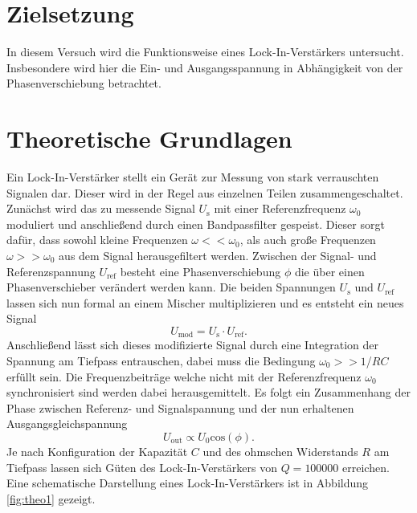 \section{Zielsetzung}

In diesem Versuch wird die Funktionsweise eines Lock-In-Verstärkers untersucht. Insbesondere wird hier die Ein- und Ausgangsspannung 
in Abhängigkeit von der Phasenverschiebung betrachtet.

\section{Theoretische Grundlagen}

Ein Lock-In-Verstärker stellt ein Gerät zur Messung von stark verrauschten Signalen dar. Dieser wird in der Regel aus einzelnen Teilen zusammengeschaltet. 
\\
Zunächst wird das zu messende Signal $U_\text{s}$ mit einer Referenzfrequenz $\omega_{0}$ moduliert und anschließend durch einen Bandpassfilter gespeist. Dieser sorgt dafür, dass sowohl kleine Frequenzen $\omega << \omega_{0}$, als auch große Frequenzen $\omega >> \omega_{0}$ aus dem Signal 
herausgefiltert werden. Zwischen der Signal- und Referenzspannung $U_\text{ref}$ besteht eine Phasenverschiebung $\phi$ die über einen Phasenverschieber verändert werden kann. Die beiden Spannungen $U_\text{s}$ und $U_\text{ref}$ lassen sich nun formal an einem Mischer multiplizieren und es entsteht ein
neues Signal 
\begin{equation*}
U_{\text{mod}} = U_\text{s} \cdot U_{\text{ref}}. 
\end{equation*}
Anschließend lässt sich dieses modifizierte Signal durch eine Integration der Spannung am Tiefpass entrauschen, dabei muss die Bedingung $\omega_0 >> 1$/$RC$ erfüllt sein. Die Frequenzbeiträge welche nicht mit der Referenzfrequenz $\omega_0$ synchronisiert sind werden dabei herausgemittelt.
Es folgt ein Zusammenhang der Phase zwischen Referenz- und Signalspannung und der
nun erhaltenen Ausgangsgleichspannung
\begin{equation}
    \label{eqn:yesss}
    U_{\text{out}} \propto U_{0} \text{cos}(\phi).
\end{equation}
Je nach Konfiguration der Kapazität $C$ und des ohmschen Widerstands $R$ am Tiefpass lassen sich Güten des Lock-In-Verstärkers von $Q = 100000$ erreichen.
\\
Eine schematische Darstellung eines Lock-In-Verstärkers ist in Abbildung \ref{fig:theo1} gezeigt.

